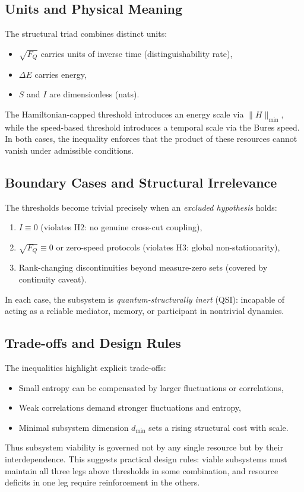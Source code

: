 \documentclass[10pt]{article}
\begin{document}
\subsection{Units and Physical Meaning}
The structural triad combines distinct units:
\begin{itemize}
    \item $\sqrt{F_Q}$ carries units of inverse time (distinguishability rate),
    \item $\Delta E$ carries energy,
    \item $S$ and $I$ are dimensionless (nats).
\end{itemize}
The Hamiltonian-capped threshold introduces an energy scale via $\|H\|_{\min}$,
while the speed-based threshold introduces a temporal scale via the Bures speed.
In both cases, the inequality enforces that the product of these resources
cannot vanish under admissible conditions.

\subsection{Boundary Cases and Structural Irrelevance}
The thresholds become trivial precisely when an \emph{excluded hypothesis} holds:
\begin{enumerate}
    \item $I\equiv 0$ (violates H2: no genuine cross-cut coupling),
    \item $\sqrt{F_Q}\equiv 0$ or zero-speed protocols (violates H3: global non-stationarity),
    \item Rank-changing discontinuities beyond measure-zero sets (covered by continuity caveat).
\end{enumerate}
In each case, the subsystem is \emph{quantum-structurally inert} (QSI): incapable of acting as a
reliable mediator, memory, or participant in nontrivial dynamics.

\subsection{Trade-offs and Design Rules}
The inequalities highlight explicit trade-offs:
\begin{itemize}
    \item Small entropy can be compensated by larger fluctuations or correlations,
    \item Weak correlations demand stronger fluctuations and entropy,
    \item Minimal subsystem dimension $d_{\min}$ sets a rising structural cost with scale.
\end{itemize}
Thus subsystem viability is governed not by any single resource but by their interdependence.
This suggests practical design rules: viable subsystems must maintain all three legs above
thresholds in some combination, and resource deficits in one leg require reinforcement in the others.
\end{document}
